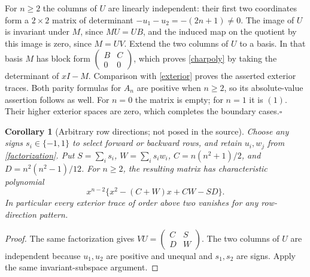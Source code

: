 \documentclass[11pt]{article}
\newtheorem{corollary}[theorem]{Corollary}
\begin{document}
For $n\geq2$ the columns of $U$ are linearly independent: their first
two coordinates form a $2\times2$ matrix of determinant
$-u_1-u_2=-(2n+1)\ne0$. The image of $U$ is invariant under $M$, since
$MU=UB$, and the induced map on the quotient by this image is zero,
since $M=UV$. Extend the two columns of $U$ to a basis. In that basis
$M$ has block form $\left(\begin{smallmatrix}B&C\\0&0\end{smallmatrix}\right)$,
which proves \eqref{charpoly} by taking the determinant of $xI-M$.
Comparison with \eqref{exterior} proves the asserted exterior traces.
Both parity formulas for $A_n$ are positive when $n\geq2$, so its
absolute-value assertion follows as well. For $n=0$ the matrix is empty;
for $n=1$ it is $(1)$. Their higher exterior spaces are zero, which
completes the boundary cases.\hfill$\square$

\begin{corollary}[Arbitrary row directions; not posed in the source]\label{directions}
Choose any signs $s_i\in\{-1,1\}$ to select forward or backward rows,
and retain $u_i,w_j$ from \eqref{factorization}. Put
$S=\sum_i s_i$, $W=\sum_i s_iw_i$,
$C=n(n^2+1)/2$, and $D=n^2(n^2-1)/12$.
For $n\geq2$, the resulting matrix has characteristic polynomial
\[
 x^{n-2}\{x^2-(C+W)x+CW-SD\}.
\]
In particular every exterior trace of order above two vanishes for any
row-direction pattern.
\end{corollary}
\begin{proof}
The same factorization gives $VU=\left(\begin{smallmatrix}C&S\\D&W\end{smallmatrix}\right)$.
The two columns of $U$ are independent because $u_1,u_2$ are positive and
unequal and $s_1,s_2$ are signs. Apply the same invariant-subspace argument.
\end{proof}
\end{document}
